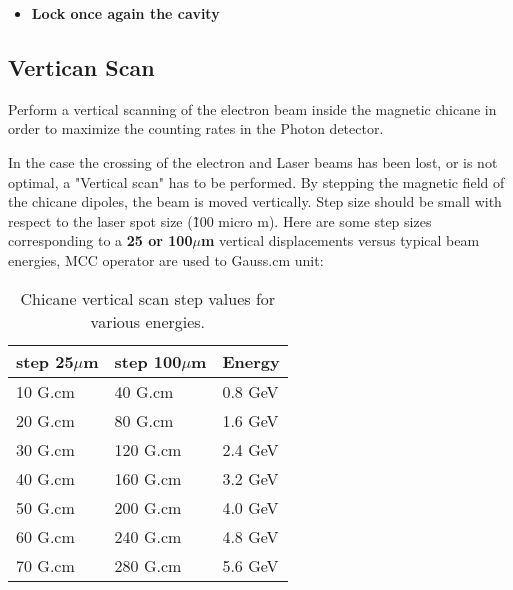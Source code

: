{{\begin{itemize}
        This procedure is only performed by MCC operators.\\

        First of all,
        the Hall A Run Coordinator must request that
        MCC tune the beam through the Compton chicane.
        MCC operators have to apply the section 2 of
        the procedure MCC-PR-04-001. If necessary
       (after a long shutdown for exemple), let's remind to the operator
       to open valves located on the Compton line.
       The complete procedure is available on the MCC web site \\
\href{http://opsntsrv.acc.jlab.org/ops_docs/online_document_files/MCC_online_files/HallA_beam_delivery_proc.pdf}%
{ at this URL}
       
\item {\bf Lock once again the cavity}\\
\end{itemize}

\subsection{Vertican Scan}
Perform a vertical scanning of the electron beam inside the magnetic chicane 
in order to maximize the counting rates in the Photon detector.

        In the case the crossing of the electron and Laser beams
        has been lost, or is not optimal, a "Vertical scan" has to be performed.
        By stepping the magnetic field of the
        chicane dipoles, the beam is moved vertically. Step size should be
        small with respect to the laser spot size (\~100 micro m). Here are some
        step sizes corresponding to a {\bf 25 or 100$\mu$m  } vertical displacements versus
        typical beam energies, MCC operator are used to Gauss.cm unit:
\begin{table}[ht]
\begin{center}
\begin{tabular}{|l|l|l|} \hline
step 25$\mu$m & step 100$\mu$m & Energy \\ \hline\hline
10 G.cm & 40 G.cm & 0.8 GeV \\ \hline
20 G.cm &  80 G.cm &  1.6 GeV \\ \hline
30 G.cm &  120 G.cm & 2.4  GeV \\ \hline
40 G.cm &  160 G.cm & 3.2  GeV \\ \hline
50 G.cm &  200 G.cm & 4.0  GeV \\ \hline
60 G.cm &  240 G.cm &  4.8 GeV \\ \hline
70 G.cm &  280 G.cm &  5.6 GeV \\ \hline 
\end{tabular}
\end{center}
\caption[Compton:vertical scan]{Chicane vertical scan step values for various energies.
}
\label{tab:compton_vscan}
\end{table}
	
}}
